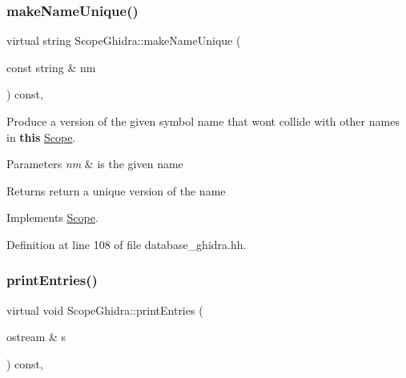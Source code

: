 \mbox{\label{class_scope_ghidra_a458977d1e0a9826d5cf7bca487ecf327}} 
\subsubsection{\texorpdfstring{makeNameUnique()}{makeNameUnique()}}
{\footnotesize\ttfamily virtual string Scope\+Ghidra\+::make\+Name\+Unique (\begin{DoxyParamCaption}\item[{const string \&}]{nm }\end{DoxyParamCaption}) const\hspace{0.3cm}{\ttfamily [inline]}, {\ttfamily [virtual]}}



Produce a version of the given symbol name that won\textquotesingle{}t collide with other names in {\bfseries{this}} \mbox{\hyperlink{class_scope}{Scope}}. 


\begin{DoxyParams}{Parameters}
{\em nm} & is the given name \\
\hline
\end{DoxyParams}
\begin{DoxyReturn}{Returns}
return a unique version of the name 
\end{DoxyReturn}


Implements \mbox{\hyperlink{class_scope_a2e0d945c44f4874743496b2814fbb631}{Scope}}.



Definition at line 108 of file database\+\_\+ghidra.\+hh.

\mbox{\label{class_scope_ghidra_a6d3865ed7c8917f5f1594f4dd63ade7a}} 
\subsubsection{\texorpdfstring{printEntries()}{printEntries()}}
{\footnotesize\ttfamily virtual void Scope\+Ghidra\+::print\+Entries (\begin{DoxyParamCaption}\item[{ostream \&}]{s }\end{DoxyParamCaption}) const\hspace{0.3cm}{\ttfamily [inline]}, {\ttfamily [virtual]}}



